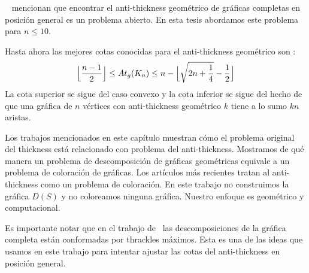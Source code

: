  ~\cite{Dujmovic2017} mencionan que encontrar el anti-thickness geométrico de
 gráficas completas en posición general es un problema abierto. En esta tesis
 abordamos este problema para $n\leq 10$.

 Hasta ahora las mejores cotas conocidas para el anti-thickness geométrico son :
 \[\Bigl\lfloor\frac{n-1}{2}\Bigr\rfloor \leq At_g(K_n) \leq n - \Bigl\lfloor
 \sqrt{2n + \frac{1}{4}} - \frac{1}{2} \Bigr\rfloor \]
 La cota superior se sigue del caso convexo y la cota inferior
 se sigue del hecho de que una gráfica de $n$ vértices
 con anti-thickness geométrico $k$ tiene a lo sumo $kn$ aristas.

Los trabajos mencionados en este capítulo muestran cómo el problema original del
thickness está relacionado con problema del anti-thickness. Mostramos de qué
manera un problema de descomposición de gráficas geométricas equivale
a un problema de coloración de gráficas. Los artículos más recientes tratan al
anti-thickness como un problema de coloración. En este trabajo no construimos la
gráfica $D(S)$ y no coloreamos ninguna gráfica. Nuestro enfoque es geométrico
y computacional.


Es importante notar que en el trabajo de~\cite{Fabila-Monroy2018} las descomposiciones
de la gráfica completa están conformadas por thrackles máximos. Esta es una de las ideas que
usamos en este trabajo para intentar ajustar las cotas del anti-thickness en posición
general.
